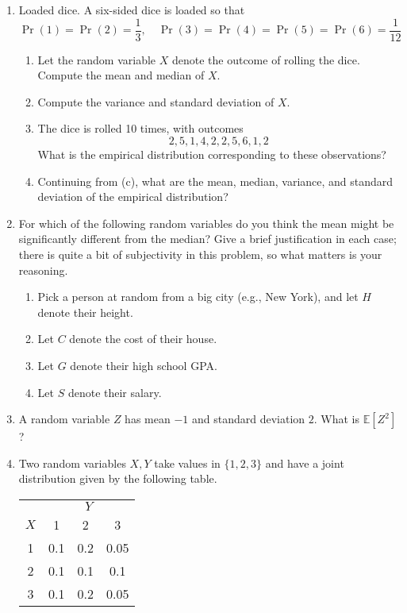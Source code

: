 \documentclass{article}
\begin{document}
\begin{enumerate}
\item Loaded dice. A six-sided dice is loaded so that
    \[
    \operatorname{Pr}(1)=\operatorname{Pr}(2)=\frac{1}{3}, \quad \operatorname{Pr}(3)=\operatorname{Pr}(4)=\operatorname{Pr}(5)=\operatorname{Pr}(6)=\frac{1}{12}
    \]
    \begin{enumerate}
    \item Let the random variable $X$ denote the outcome of rolling the dice. Compute the mean and median of $X$.
    \item Compute the variance and standard deviation of $X$.
    \item The dice is rolled 10 times, with outcomes
        \[
        2,5,1,4,2,2,5,6,1,2
        \]
        What is the empirical distribution corresponding to these observations?
    \item Continuing from (c), what are the mean, median, variance, and standard deviation of the empirical distribution?
    \end{enumerate}

\item For which of the following random variables do you think the mean might be significantly different from the median? Give a brief justification in each case; there is quite a bit of subjectivity in this problem, so what matters is your reasoning.
    \begin{enumerate}
    \item Pick a person at random from a big city (e.g., New York), and let $H$ denote their height.
    \item Let $C$ denote the cost of their house.
    \item Let $G$ denote their high school GPA.
    \item Let $S$ denote their salary.
    \end{enumerate}

\item A random variable $Z$ has mean $-1$ and standard deviation $2$. What is $\mathbb{E}\left[Z^{2}\right]$?

\item Two random variables $X, Y$ take values in $\{1,2,3\}$ and have a joint distribution given by the following table.

    \begin{table}[h]
    \centering
    \begin{tabular}{c|ccc}
    & \multicolumn{3}{c}{$Y$} \\
    \cline{2-4}
    $X$ & 1 & 2 & 3 \\
    \hline
    1 & 0.1 & 0.2 & 0.05 \\
    2 & 0.1 & 0.1 & 0.1 \\
    3 & 0.1 & 0.2 & 0.05
    \end{tabular}
    \end{table}


\end{enumerate}
\end{document}
